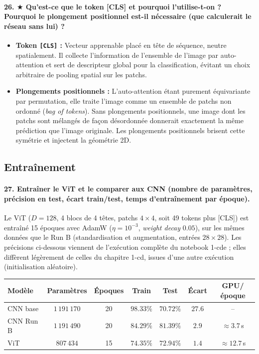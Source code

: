 \documentclass{report}
\begin{document}
\paragraph{26. $\bigstar$ Qu'est-ce que le token [CLS] et pourquoi l'utilise-t-on ? Pourquoi le plongement positionnel est-il nécessaire (que calculerait le réseau sans lui) ?}
\begin{itemize}
    \item \textbf{Token \texttt{[CLS]} :} Vecteur apprenable placé en tête de séquence, neutre spatialement. Il collecte l'information de l'ensemble de l'image par auto-attention et sert de descripteur global pour la classification, évitant un choix arbitraire de pooling spatial sur les patchs.
    \item \textbf{Plongements positionnels :} L'auto-attention étant purement équivariante par permutation, elle traite l'image comme un ensemble de patchs non ordonné (\textit{bag of tokens}). Sans plongements positionnels, une image dont les patchs sont mélangés de façon désordonnée donnerait exactement la même prédiction que l'image originale. Les plongements positionnels brisent cette symétrie et injectent la géométrie 2D.
\end{itemize}

\subsection{Entraînement}
\paragraph{27. Entraîner le ViT et le comparer aux CNN (nombre de paramètres, précision en test, écart train/test, temps d'entraînement par époque).}
Le ViT ($D = 128$, 4 blocs de 4 têtes, patchs $4 \times 4$, soit 49 tokens plus [CLS]) est entraîné 15 époques avec AdamW ($\eta = 10^{-3}$, \textit{weight decay} $0.05$), sur les mêmes données que le Run B (standardisation et augmentation, entrées $28 \times 28$). Les précisions ci-dessous viennent de l'exécution complète du notebook 1-cde ; elles diffèrent légèrement de celles du chapitre 1-cd, issues d'une autre exécution (initialisation aléatoire).

\begin{table}[H]
\centering
\small
\begin{tabular}{lcccccc}
\toprule
\textbf{Modèle} & \textbf{Paramètres} & \textbf{Époques} & \textbf{Train} & \textbf{Test} & \textbf{Écart} & \textbf{GPU/époque} \\
\midrule
CNN base & $1\,191\,170$ & 20 & $98.33\%$ & $70.72\%$ & $27.6$ & -- \\
CNN Run B & $1\,191\,490$ & 20 & $84.29\%$ & $\mathbf{81.39\%}$ & $2.9$ & $\approx 3.7$\,s \\
ViT & $807\,434$ & 15 & $74.35\%$ & $72.94\%$ & $1.4$ & $\approx 12.7$\,s \\
\bottomrule
\end{tabular}
\end{table}
\end{document}
